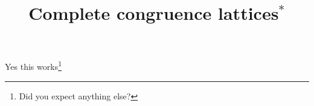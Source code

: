 \documentclass{amsart}
\title[Complete congruence lattices]%
    {Complete congruence lattices$^*$}
\begin{document}
\maketitle
{\renewcommand{\thefootnote}{\fnsymbol{footnote}}
}

Yes this works\footnote{Did you expect anything else?}
\end{document}
